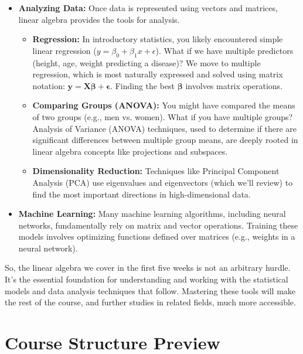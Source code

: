 \documentclass[11pt]{article}
\theoremstyle{definition}
\theoremstyle{remark}
\begin{document}
\begin{itemize}
    \item \textbf{Analyzing Data:} Once data is represented using vectors and matrices, linear algebra provides the tools for analysis.
        \begin{itemize}
            \item \textbf{Regression:} In introductory statistics, you likely encountered simple linear regression ($y = \beta_0 + \beta_1 x + \epsilon$). What if we have multiple predictors (height, age, weight predicting a disease)? We move to multiple regression, which is most naturally expressed and solved using matrix notation: $\mathbf{y} = \mathbf{X}\boldsymbol{\beta} + \boldsymbol{\epsilon}$. Finding the best $\boldsymbol{\beta}$ involves matrix operations.
            \item \textbf{Comparing Groups (ANOVA):} You might have compared the means of two groups (e.g., men vs. women). What if you have multiple groups? Analysis of Variance (ANOVA) techniques, used to determine if there are significant differences between multiple group means, are deeply rooted in linear algebra concepts like projections and subspaces.
            \item \textbf{Dimensionality Reduction:} Techniques like Principal Component Analysis (PCA) use eigenvalues and eigenvectors (which we'll review) to find the most important directions in high-dimensional data.
        \end{itemize}

    \item \textbf{Machine Learning:} Many machine learning algorithms, including neural networks, fundamentally rely on matrix and vector operations. Training these models involves optimizing functions defined over matrices (e.g., weights in a neural network).
\end{itemize}

So, the linear algebra we cover in the first five weeks is not an arbitrary hurdle. It's the essential foundation for understanding and working with the statistical models and data analysis techniques that follow. Mastering these tools will make the rest of the course, and further studies in related fields, much more accessible.

\section{Course Structure Preview}
\end{document}
